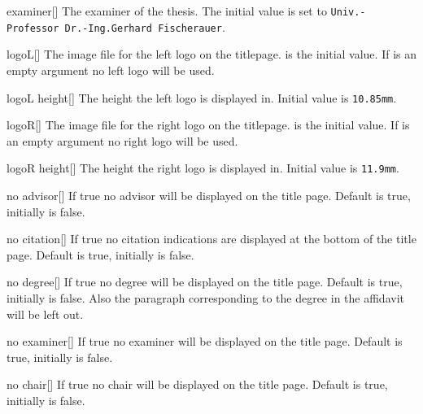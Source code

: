 \begin{describeopt}{examiner}[]
  The examiner of the thesis. The initial value is set to
  \texttt{Univ.-Professor Dr.-Ing.\@ Gerhard Fischerauer}.
\end{describeopt}
\begin{describeopt}{logoL}[]
  The image file for the left logo on the titlepage.
   is the initial value. If  is an
  empty argument no left logo will be used.
\end{describeopt}
\begin{describeopt}{logoL height}[]
  The height the left logo is displayed in. Initial value is \verb|10.85mm|.
\end{describeopt}
\begin{describeopt}{logoR}[]
  The image file for the right logo on the titlepage.
  \- is the initial value. If
   is an empty argument no right logo will be used.
\end{describeopt}
\begin{describeopt}{logoR height}[]
  The height the right logo is displayed in. Initial value is \verb|11.9mm|.
\end{describeopt}
\begin{describeopt}{no advisor}[]
  If true no advisor will be displayed on the title page. Default is true,
  initially is false.
\end{describeopt}
\begin{describeopt}{no citation}[]
  If true no citation indications are displayed at the bottom of the title page.
  Default is true, initially is false.
\end{describeopt}
\begin{describeopt}{no degree}[]
  If true no degree will be displayed on the title page. Default is true,
  initially is false. Also the paragraph corresponding to the degree in the
  affidavit will be left out.
\end{describeopt}
\begin{describeopt}{no examiner}[]
  If true no examiner will be displayed on the title page. Default is true,
  initially is false.
\end{describeopt}
\begin{describeopt}{no chair}[]
  If true no chair will be displayed on the title page. Default is true,
  initially is false.
\end{describeopt}
